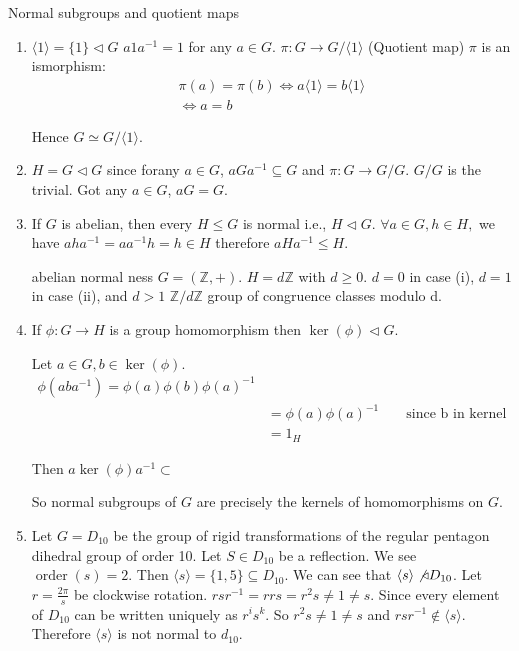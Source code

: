 \documentclass{article}
\DeclareMathOperator{\order}{order}
\begin{document}
\begin{cex}{Normal subgroups and quotient maps}{}
    \begin{enumerate}
        \item $ \langle 1 \rangle = \{ 1 \} \triangleleft G$
            $a1a^{-1} = 1$ for any $a \in G$. 
            $ \pi : G \to G/ \langle 1 \rangle$ (Quotient map)
            $\pi$ is an ismorphism: 
            \begin{align*}
                \pi(a) = \pi(b) \iff a \langle 1 \rangle = b \langle 1 \rangle\\
                \iff a = b
            \end{align*}

            Hence $G \simeq G/ \langle 1 \rangle$. 
        \item $H = G \triangleleft G$ since forany $a \in G$,  $aGa^{-1} \subseteq G$ and $\pi : G \to G/G$. $G/G$ is the trivial. Got any $a \in G$, $aG = G$. 
        \item If $G$ is abelian, then every $H \leq G$ is normal i.e., $H \triangleleft G$. $\forall a\in G, h \in H, $ we have $aha^{-1} = aa^{-1}h = h \in H$ therefore $aHa^{-1} \leq H$. 
            \begin{cex}{abelian normal ness}{}
                $G = (\mathbb{Z}, +)$. $H = d\mathbb{Z}$ with $d \geq 0$. $d=0$ in case (i), $d = 1$ in case (ii), and $d > 1$ $\mathbb{Z}/d\mathbb{Z}$ group of congruence classes modulo d.
            \end{cex}
        \item If $\phi : G \to H$ is a group homomorphism then $\ker(\phi) \triangleleft G$. 
            \begin{cpf}
                Let $a \in G, b \in \ker(\phi) $.
                \begin{align*}
                    \phi(aba^{-1}) = \phi(a)\phi(b)\phi(a)^{-1}\\
                    & = \phi(a)\phi(a)^{-1} &&\text{ since b in kernel }\\
                    & = 1_H
                \end{align*}
            \end{cpf}
            Then $a \ker(\phi) a^{-1} \subset$ 

            So normal subgroups of $G$ are precisely the kernels of homomorphisms on $G$. 

        \item Let $G = D_{10}$ be the group of rigid transformations of the regular pentagon dihedral group of order 10. Let $S \in D_{10}$ be a reflection. We see $\order(s) = 2$. Then $ \langle s \rangle = \{1,5\} \subseteq D_{10}$. We can see that $ \langle s \rangle \not \triangleleft D_{10}$. Let $r = \frac{2\pi}{s}$ be clockwise rotation. $rsr^{-1} = rrs = r^2 s \neq 1 \neq s$. Since every element of $D_{10}$ can be written uniquely as $r^{i}s^{k}$. So $r^2s \neq 1 \neq s$ and $rsr^{-1} \not\in \langle s \rangle$. Therefore $ \langle s \rangle$ is not normal to $d_{10}$. 


\end{enumerate}
\end{cex}
\end{document}
